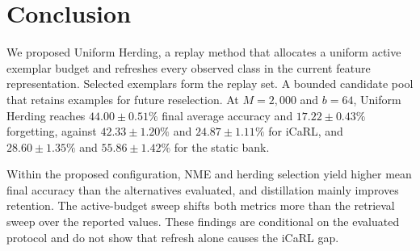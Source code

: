 \section{Conclusion}
\label{sec:conclusion}

We proposed Uniform Herding, a replay method that allocates a uniform active
exemplar budget and refreshes every observed class in the current feature representation.
Selected exemplars form the replay set. A bounded candidate pool that retains
examples for future reselection.  At $M=2{,}000$ and $b=64$, Uniform Herding
reaches $44.00\pm0.51\%$ final average accuracy and $17.22\pm0.43\%$
forgetting, against $42.33\pm1.20\%$ and $24.87\pm1.11\%$ for iCaRL,
and $28.60\pm1.35\%$ and $55.86\pm1.42\%$ for the static bank.

Within the proposed configuration, NME and herding selection yield higher mean final
accuracy than the alternatives evaluated, and distillation mainly improves
retention.  The active-budget sweep shifts both metrics more than the retrieval
sweep over the reported values.  These findings are conditional on
the evaluated protocol and do not show that refresh alone causes the iCaRL gap.
